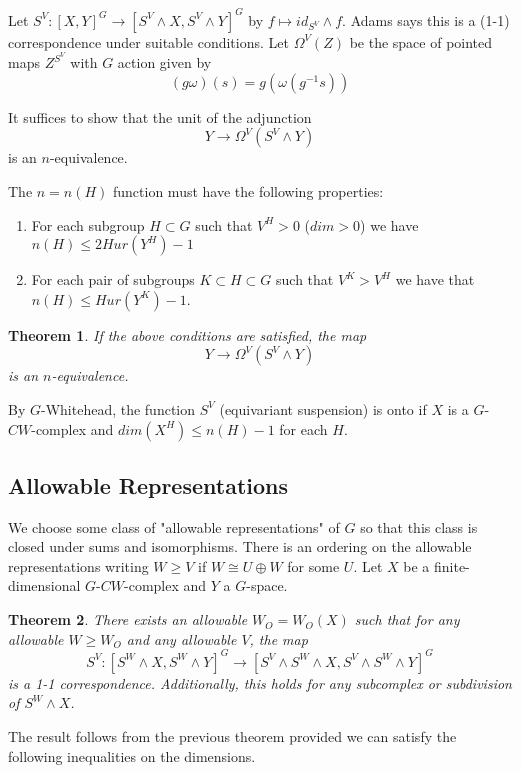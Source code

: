 \documentclass{article}
\theoremstyle{problemstyle}
\theoremstyle{problemstyle}
\theoremstyle{problemstyle}
\theoremstyle{problemstyle}
\theoremstyle{problemstyle}
\theoremstyle{problemstyle}
\newtheorem{theorem}{Theorem}
\begin{document}
Let $S^V : [X,Y]^G \rightarrow [S^V \wedge X,S^V \wedge Y]^G$ by $f \mapsto id_{S^V} \wedge f$. Adams says this is a (1-1) correspondence under suitable conditions. Let $\Omega^V(Z)$ be the space of pointed maps $Z^{S^V}$ with $G$ action given by $$(g\omega)(s) = g(\omega(g^{-1}s))$$

It suffices to show that the unit of the adjunction $$Y \rightarrow \Omega^V (S^V\wedge Y)$$ is an $n$-equivalence. 

The $n = n(H)$ function must have the following properties:

\begin{enumerate}
\item For each subgroup $H \subset G$ such that $V^H > 0$ ($dim >0$) we have $n(H) \leq 2 Hur(Y^H)-1$
\item For each pair of subgroups $K \subset H \subset G$ such that $V^K > V^H$ we have that $n(H) \leq Hur(Y^K)-1$. 
\end{enumerate}

\begin{theorem}
If the above conditions are satisfied, the map $$Y \rightarrow \Omega^V (S^V\wedge Y)$$ is an $n$-equivalence. 
\end{theorem}

By $G$-Whitehead, the function $S^V$ (equivariant suspension) is onto if $X$ is a $G$-$CW$-complex and $dim(X^H) \leq n(H)-1$ for each $H$. 

\subsection{Allowable Representations}

We choose some class of "allowable representations" of $G$ so that this class is closed under sums and isomorphisms. There is an ordering on the allowable representations writing $W \geq V$ if $W \cong U \oplus W$ for some $U$. Let $X$ be a finite-dimensional $G$-$CW$-complex and $Y$ a $G$-space.

\begin{theorem}
There exists an allowable $W_O = W_O(X)$ such that for any allowable $W \geq W_O$ and any allowable $V$, the map $$S^V:[S^W \wedge X,S^W \wedge Y]^G \rightarrow[S^V \wedge S^W \wedge X,S^V \wedge S^W \wedge Y]^G$$ is a 1-1 correspondence. Additionally, this holds for any subcomplex or subdivision of $S^W \wedge X$. 
\end{theorem}

The result follows from the previous theorem provided we can satisfy the following inequalities on the dimensions. 
\end{document}
